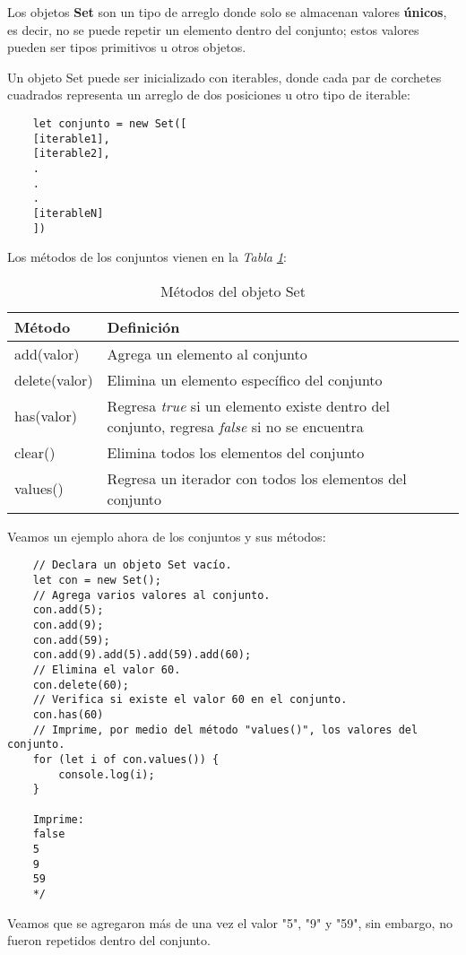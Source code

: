 Los objetos \textbf{Set} son un tipo de arreglo donde solo se almacenan valores \textbf{únicos}, es decir, no se puede repetir un elemento dentro del conjunto; estos valores pueden ser tipos primitivos u otros objetos.

Un objeto Set puede ser inicializado con iterables, donde cada par de corchetes cuadrados representa un arreglo de dos posiciones u otro tipo de iterable:
\begin{lstlisting}
    let conjunto = new Set([
    [iterable1],
    [iterable2],
    .
    .
    .
    [iterableN]
    ])
\end{lstlisting}

Los métodos de los conjuntos vienen en la \textit{Tabla \ref{tab: 13}}:
\begin{table}[H]
    \begin{center}
        \caption{Métodos del objeto Set}
        \label{tab: 13}
        \begin{tabular}{m{3cm} m{10cm}}
            \hline
            \textbf{Método} & \textbf{Definición} \\
            \hline
            add(valor)      & Agrega un elemento al conjunto \\
            delete(valor)   & Elimina un elemento específico del conjunto \\
            has(valor)      & Regresa \textit{true} si un elemento existe dentro del conjunto, regresa \textit{false} si no se encuentra \\
            clear()         & Elimina todos los elementos del conjunto \\
            values()        & Regresa un iterador con todos los elementos del conjunto \\
            \hline
        \end{tabular}
    \end{center}    
\end{table}

Veamos un ejemplo ahora de los conjuntos y sus métodos:
\begin{lstlisting}
    // Declara un objeto Set vacío.
    let con = new Set();
    // Agrega varios valores al conjunto.
    con.add(5);
    con.add(9);
    con.add(59);
    con.add(9).add(5).add(59).add(60);
    // Elimina el valor 60.
    con.delete(60);
    // Verifica si existe el valor 60 en el conjunto.
    con.has(60)
    // Imprime, por medio del método "values()", los valores del conjunto.
    for (let i of con.values()) {
        console.log(i);
    }
    
    Imprime:
    false
    5
    9
    59
    */
\end{lstlisting}

Veamos que se agregaron más de una vez el valor "5", "9" y "59", sin embargo, no fueron repetidos dentro del conjunto.
